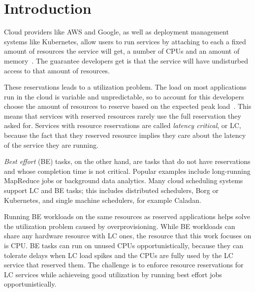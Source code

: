 \section{Introduction}
\label{s:intro}

Cloud providers like AWS and Google, as well as deployment management systems
like Kubernetes, allow users to run services by attaching to each a fixed amount
of resources the service will get, \ie{} a number of CPUs and an amount of
memory~\cite{aws-ec2-resources, kubernetes-resources}. The guarantee developers
get is that the service will have undisturbed access to that amount of
resources.

These reservations leads to a utilization problem. The load on most applications
run in the cloud is variable and unpredictable, so to account for this
developers choose the amount of resources to reserve based on the expected peak
load~\cite{borg, nu, overprovision}. This means that services with reserved
resources rarely use the full reservation they asked for. Services with resource
reservations are called \textit{latency critical}, or LC, because the fact that
they reserved resource implies they care about the latency of the service they
are running.

\textit{Best effort} (BE) tasks, on the other hand, are tasks that do not have
reservations and whose completion time is not critical. Popular examples include
long-running MapReduce jobs or background data analytics. Many cloud scheduling
systems support LC and BE tasks; this includes distributed schedulers, \eg{}
Borg\cite{borg} or Kubernetes\cite{kubernetes-resources}, and single machine
schedulers, for example Caladan\cite{caladan}.

Running BE workloads on the same resources as reserved applications helps solve
the utilization problem caused by overprovisioning. While BE workloads can share
any hardware resource with LC ones, the resource that this work focuses on is
CPU. BE tasks can run on unused CPUs opportunistically, because they can
tolerate delays when LC load spikes and the CPUs are fully used by the LC
service that reserved them. The challenge is to enforce resource reservations
for LC services while achieveing good utilization by running best effort jobs
opportunistically.


